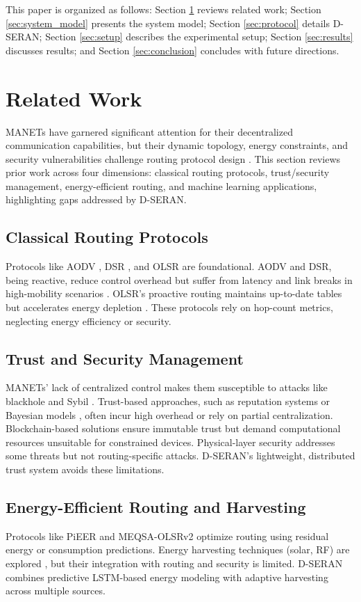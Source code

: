 \documentclass[preprint]{elsarticle}
\begin{document}
This paper is organized as follows: Section \ref{sec:related_work} reviews related work; Section \ref{sec:system_model} presents the system model; Section \ref{sec:protocol} details D-SERAN; Section \ref{sec:setup} describes the experimental setup; Section \ref{sec:results} discusses results; and Section \ref{sec:conclusion} concludes with future directions.

\section{Related Work}
\label{sec:related_work}

MANETs have garnered significant attention for their decentralized communication capabilities, but their dynamic topology, energy constraints, and security vulnerabilities challenge routing protocol design \cite{6,8}. This section reviews prior work across four dimensions: classical routing protocols, trust/security management, energy-efficient routing, and machine learning applications, highlighting gaps addressed by D-SERAN.

\subsection{Classical Routing Protocols}
Protocols like AODV \cite{1}, DSR \cite{2}, and OLSR \cite{3} are foundational. AODV and DSR, being reactive, reduce control overhead but suffer from latency and link breaks in high-mobility scenarios \cite{4}. OLSR’s proactive routing maintains up-to-date tables but accelerates energy depletion \cite{5}. These protocols rely on hop-count metrics, neglecting energy efficiency or security.

\subsection{Trust and Security Management}
MANETs’ lack of centralized control makes them susceptible to attacks like blackhole and Sybil \cite{6,9}. Trust-based approaches, such as reputation systems or Bayesian models \cite{6,9}, often incur high overhead or rely on partial centralization. Blockchain-based solutions \cite{8} ensure immutable trust but demand computational resources unsuitable for constrained devices. Physical-layer security \cite{12} addresses some threats but not routing-specific attacks. D-SERAN’s lightweight, distributed trust system avoids these limitations.

\subsection{Energy-Efficient Routing and Harvesting}
Protocols like PiEER \cite{10} and MEQSA-OLSRv2 \cite{11} optimize routing using residual energy or consumption predictions. Energy harvesting techniques (solar, RF) are explored \cite{13,14}, but their integration with routing and security is limited. D-SERAN combines predictive LSTM-based energy modeling with adaptive harvesting across multiple sources.
\end{document}
